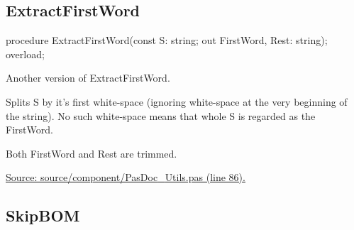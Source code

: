 \documentclass{report}
\newif\ifpdf
\begin{document}
\subsection*{ExtractFirstWord}
\fi
\label{PasDoc_Utils-ExtractFirstWord}
\begin{list}{}{
\setlength{\itemindent}{0cm}
\setlength{\listparindent}{0cm}
\setlength{\leftmargin}{\evensidemargin}
\addtolength{\leftmargin}{\tmplength}
\settowidth{\labelsep}{X}
\addtolength{\leftmargin}{\labelsep}
\setlength{\labelwidth}{\tmplength}
}
\item[\textbf{Declaration}\hfill]
\ifpdf
\begin{flushleft}
\fi
\begin{ttfamily}
procedure ExtractFirstWord(const S: string; out FirstWord, Rest: string); overload;\end{ttfamily}

\ifpdf
\end{flushleft}
\fi

\par
\item[\textbf{Description}]
Another version of ExtractFirstWord.

Splits S by it's first white{-}space (ignoring white{-}space at the very beginning of the string). No such white{-}space means that whole S is regarded as the FirstWord.

Both FirstWord and Rest are trimmed.\par
\href{https://github.com/pasdoc/pasdoc/blob/master/source/component/PasDoc_Utils.pas#L86}{Source: source/component/PasDoc{\_}Utils.pas (line 86).}

\end{list}
\ifpdf
\subsection*{\large{\textbf{SkipBOM}}\normalsize\hspace{1ex}\hrulefill}
\else
\end{document}
